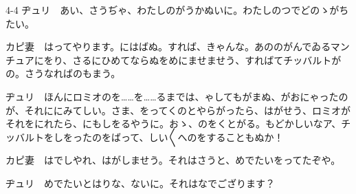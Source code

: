 \documentclass[tate,paper=b6j,jafontsize=9pt]{jlreq}
\begin{document}
\begin{azconvIndented}{4\zw}{-4\zw}
ヂュリ　あい、さうぢゃ、わたしのがうかぬいに。わたしのつでどのゝがちたい。

カピ妻　はってやります。にはばぬ。すれば、きゃんな。あののがんでゐるマンチュアにをり、さるにひめてならぬをめにませませう、すればてチッバルトがの。さうなればのもまう。

ヂュリ　ほんにロミオのを……を……るまでは、ゃしてもがまぬ、がおにゃったのが、それににみてしい。さま、をってくのとやらがったら、はがせう、ロミオがそれをにれたら、にもしをるやうに。おゝ、のをくとがる。もどかしいなア、チッバルトをしをったのをばって、しい{〳〵}へのをすることもぬか！

カピ妻　はでしやれ、はがしませう。それはさうと、めでたいをってたぞや。

ヂュリ　めでたいとはりな、ないに。それはなでござります？


\end{azconvIndented}
\end{document}
